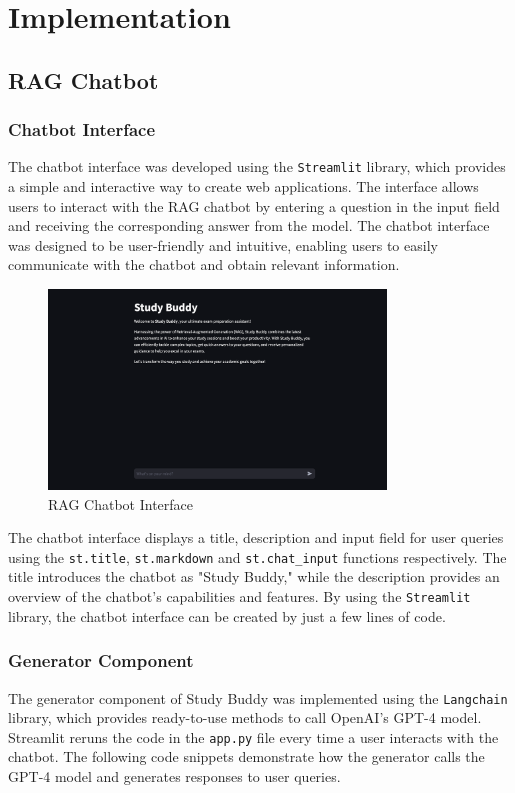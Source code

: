\chapter{Implementation}
\section{RAG Chatbot}
    \subsection{Chatbot Interface}
        The chatbot interface was developed using the \texttt{Streamlit} library, which provides a simple and interactive way to create web applications. The interface allows users to interact with the RAG chatbot by entering a question in the input field and receiving the corresponding answer from the model. The chatbot interface was designed to be user-friendly and intuitive, enabling users to easily communicate with the chatbot and obtain relevant information.
        \begin{figure}[H]
            \centering
            \includegraphics[width=0.8\textwidth]{figs/interface.png}
            \caption{RAG Chatbot Interface}
            \label{fig:chatbot_interface}
        \end{figure}
            
            The chatbot interface displays a title, description and input field for user queries using the \texttt{st.title}, \texttt{st.markdown} and \texttt{st.chat\_input} functions respectively. The title introduces the chatbot as "Study Buddy," while the description provides an overview of the chatbot's capabilities and features. By using the \texttt{Streamlit} library, the chatbot interface can be created by just a few lines of code.

\subsection{Generator Component}
The generator component of Study Buddy was implemented using the \texttt{Langchain} library, which provides ready-to-use methods to call OpenAI's GPT-4 model. Streamlit reruns the code in the \texttt{app.py} file every time a user interacts with the chatbot. The following code snippets demonstrate how the generator calls the GPT-4 model and generates responses to user queries.

